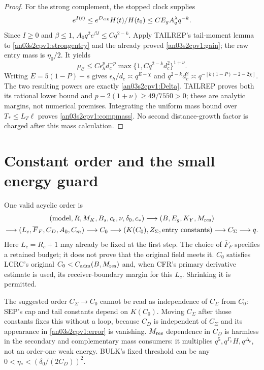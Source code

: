 \documentclass[11pt]{article}
\theoremstyle{remark}\newtheorem{remark}[theorem]{Remark}
\begin{document}
\begin{proof}
For the strong complement, the stopped clock supplies
\[
 e^{I(t)}\le e^{D_{\rm clk}}H(t)/H(t_0)
       \le C E_g A_q^\lambda q^{-k}.
\]
Since $I\ge0$ and $\beta\le1$, $A_0q^2e^{\beta I}\le Cq^{2-k}$.
Apply TAILREP's tail-moment lemma to
\eqref{an03s2cpv1:strongentry} and the already proved
\eqref{an03s2cpv1:gain}; the raw entry mass is $\eta_0/2$.
It yields
\[
 \mu_{\mathcal C}\le
 C\epsilon_h^p d_c^{-p}
       \max\{1,Cq^{2-k}d_c^2\}^{1+\nu}.
\]
Writing $E=5(1-P)-s$ gives
$\epsilon_h/d_c\asymp q^{E-\chi}$ and
$q^{2-k}d_c^2\asymp q^{-[k(1-P)-2-2\chi]}$.
The two resulting powers are exactly
\eqref{an03s2cpv1:Delta}. TAILREP proves both its rational
lower bound and $p-2(1+\nu)\ge49/7550>0$; these are analytic
margins, not numerical premises. Integrating the uniform mass
bound over $T_*\le L_T\ell$ proves
\eqref{an03s2cpv1:compmass}. No second distance-growth factor
is charged after this mass calculation.
\end{proof}

\section{Constant order and the small energy guard}
\label{an03s2cpv1:order}
One valid acyclic order is
\begin{equation}
 \begin{gathered}
 (\text{model},R,M_K,B_s,c_b,\nu,\delta_0,c_*)
 \longrightarrow(B,E_g,K_Y,M_{\rm res})\\
 \longrightarrow(L_c,\overline F_F,C_D,A_0,C_m)
 \longrightarrow C_0
 \longrightarrow(K(C_0),Z_\Sigma,\text{entry constants})
 \longrightarrow C_\Sigma\longrightarrow q.
 \end{gathered}
 \label{an03s2cpv1:orderdisplay}
\end{equation}
Here $L_c=R_c+1$ may already be fixed at the first step.
The choice of $\overline F_F$ specifies a retained budget; it
does not prove that the original field meets it. $C_0$ satisfies
LCRC's original $C_0<C_{\rm adm}(B,M_{\rm res})$ and, when CFR's
primary derivative estimate is used, its receiver-boundary
margin for this $L_c$. Shrinking it is permitted.

The suggested order $C_\Sigma\to C_0$ cannot be read as
independence of $C_\Sigma$ from $C_0$: SEP's cap and tail constants
depend on $K(C_0)$. Moving $C_\Sigma$ after those constants fixes
this without a loop, because $C_D$ is independent of
$C_\Sigma$ and its appearance in \eqref{an03s2cpv1:error} is
vanishing. $M_{\rm res}$ dependence in $C_D$ is harmless in
the secondary and complementary mass consumers: it multiplies
$q^5,q^{\Gamma_\nu}H,q^{\Delta_\nu}$, not an order-one weak
energy. BULK's fixed threshold can be any
$0<\eta_*<(\delta_0/(2C_D))^2$.
\end{document}

